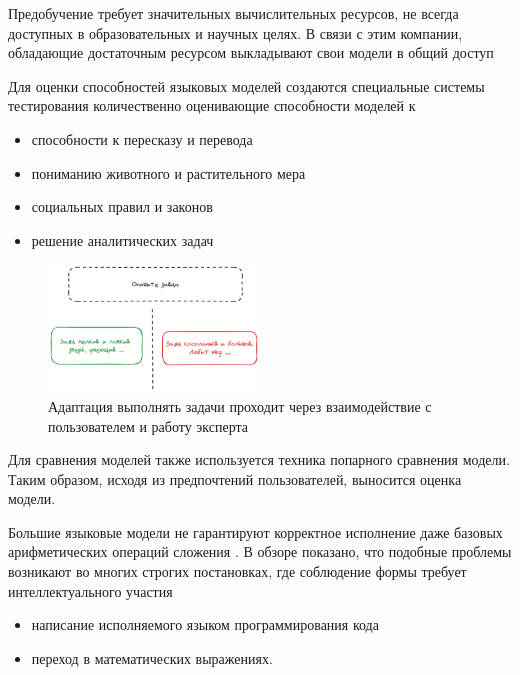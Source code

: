 Предобучение требует значительных вычислительных ресурсов, 
не всегда доступных в образовательных и научных
целях. В связи с этим компании, обладающие достаточным
ресурсом выкладывают свои модели в общий доступ \cite{jiang2023mistral}\cite{jiang2024mixtral}\cite{touvron2023llama}

Для оценки способностей языковых моделей создаются специальные системы тестирования количественно оценивающие способности моделей к \begin{itemize}
    \item способности к пересказу и перевода
    \item пониманию животного и растительного мера
    \item социальных правил и законов 
    \item решение аналитических задач 
\end{itemize}

\begin{figure}[h]
    \centering
    \includegraphics[width=0.5\textwidth]{assets/work/arch/instruction.excalidraw.png}
    \caption{Адаптация выполнять задачи проходит через взаимодействие с пользователем и работу эксперта}
    \label{instruction}
\end{figure}

Для сравнения моделей также используется техника попарного сравнения модели. 
Таким образом, исходя из предпочтений пользователей, выносится оценка модели.

Большие языковые модели не гарантируют корректное исполнение даже базовых арифметических операций сложения . 
В обзоре \cite{zhao2023survey} показано, что подобные проблемы возникают во многих строгих постановках, где
соблюдение формы требует интеллектуального участия \begin{itemize}
    \item написание исполняемого языком программирования кода
    \item переход в математических выражениях.
\end{itemize} 

